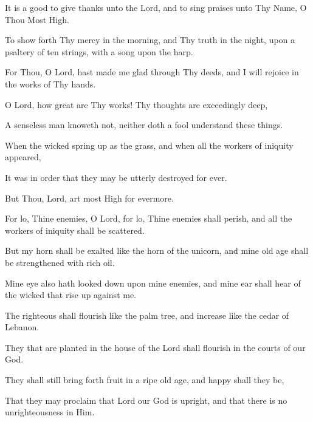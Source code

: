 It is a good to give thanks unto the Lord, and to sing praises unto Thy Name, O Thou Most High.

To show forth Thy mercy in the morning, and Thy truth in the night, upon a psaltery of ten strings, with a song upon the harp.

For Thou, O Lord, hast made me glad through Thy deeds, and I will rejoice in the works of Thy hands.

O Lord, how great are Thy works! Thy thoughts are exceedingly deep,

A senseless man knoweth not, neither doth a fool understand these things.

When the wicked spring up as the grass, and when all the workers of iniquity appeared,

It  was in order that they may be utterly destroyed for ever.

But Thou, Lord, art most High for evermore.

For lo, Thine enemies, O Lord, for lo, Thine enemies shall perish, and all the workers of iniquity shall be scattered.

But my horn shall be exalted like the horn of the unicorn, and mine old age shall be strengthened with rich oil.

Mine eye also hath looked down upon mine enemies, and mine ear shall hear of the wicked that rise up against me.

The righteous shall flourish like the palm tree, and increase like the cedar of Lebanon.

They that are planted in the house of the Lord shall flourish in the courts of our God.

They shall still bring forth fruit in a ripe old age, and happy shall they be,

That they may proclaim that Lord our God is upright, and that there is no unrighteousness in Him.
